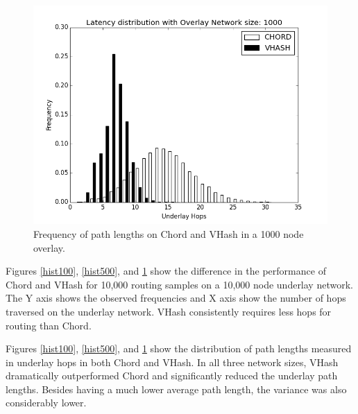 \documentclass[10pt, conference, letterpaper]{IEEEtran}
\begin{document}
{\begin{figure}
	\centering
	\includegraphics[width=\linewidth]{hist_1000}
	\caption{Frequency of path lengths on Chord and VHash in a 1000 node overlay.}
	\label{hist1000}
\end{figure}

Figures \ref{hist100}, \ref{hist500}, and \ref{hist1000} show the difference in the performance of Chord and VHash for 10,000 routing samples on a 10,000 node underlay network. 
The Y axis shows the observed frequencies and X axis show the number of hops traversed on the underlay network.
VHash consistently requires less hops for routing than Chord.


}



Figures \ref{hist100}, \ref{hist500}, and \ref{hist1000} show the distribution of path lengths measured in underlay hops in both Chord and VHash.   
In all three network sizes, VHash dramatically outperformed Chord and significantly reduced the underlay path lengths.  
Besides having a much lower average path length, the variance was also considerably lower.
\end{document}
